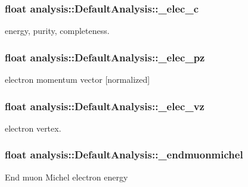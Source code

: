 \subsubsection[{\texorpdfstring{\+\_\+elec\+\_\+c}{_elec_c}}]{\setlength{\rightskip}{0pt plus 5cm}float analysis\+::\+Default\+Analysis\+::\+\_\+elec\+\_\+c\hspace{0.3cm}{\ttfamily [private]}}\hypertarget{classanalysis_1_1DefaultAnalysis_a5ce51cfe745fbf0327541a1877a99f87}{}\label{classanalysis_1_1DefaultAnalysis_a5ce51cfe745fbf0327541a1877a99f87}
energy, purity, completeness. 
\subsubsection[{\texorpdfstring{\+\_\+elec\+\_\+pz}{_elec_pz}}]{\setlength{\rightskip}{0pt plus 5cm}float analysis\+::\+Default\+Analysis\+::\+\_\+elec\+\_\+pz\hspace{0.3cm}{\ttfamily [private]}}\hypertarget{classanalysis_1_1DefaultAnalysis_a9b95bd76e4e70fe2530e3febc8db366c}{}\label{classanalysis_1_1DefaultAnalysis_a9b95bd76e4e70fe2530e3febc8db366c}
electron momentum vector \mbox{[}normalized\mbox{]} 
\subsubsection[{\texorpdfstring{\+\_\+elec\+\_\+vz}{_elec_vz}}]{\setlength{\rightskip}{0pt plus 5cm}float analysis\+::\+Default\+Analysis\+::\+\_\+elec\+\_\+vz\hspace{0.3cm}{\ttfamily [private]}}\hypertarget{classanalysis_1_1DefaultAnalysis_ad728b8375e4d62c128d767fcebbab1d9}{}\label{classanalysis_1_1DefaultAnalysis_ad728b8375e4d62c128d767fcebbab1d9}
electron vertex. 
\subsubsection[{\texorpdfstring{\+\_\+endmuonmichel}{_endmuonmichel}}]{\setlength{\rightskip}{0pt plus 5cm}float analysis\+::\+Default\+Analysis\+::\+\_\+endmuonmichel\hspace{0.3cm}{\ttfamily [private]}}\hypertarget{classanalysis_1_1DefaultAnalysis_a3797bcb310074825add03ce03175fdc3}{}\label{classanalysis_1_1DefaultAnalysis_a3797bcb310074825add03ce03175fdc3}
End muon Michel electron energy 
